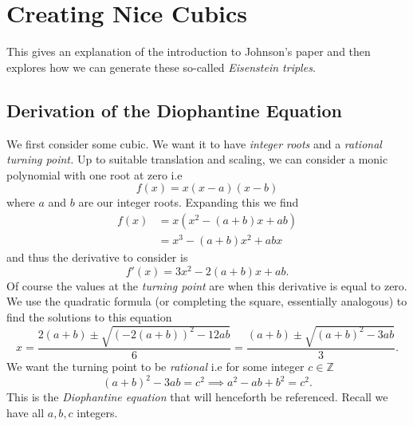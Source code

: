 \documentclass[12pt]{article}
\newcommand{\Z}{\mathbb{Z}}
\begin{document}
\section{Creating Nice Cubics}
This gives an explanation of the introduction to Johnson's paper and then explores how we can generate these so-called \textit{Eisenstein triples}.

\subsection{Derivation of the Diophantine Equation}
We first consider some cubic. We want it to have \textit{integer roots} and a \textit{rational turning point.} Up to suitable translation and scaling, we can consider a monic polynomial with one root at zero i.e
\begin{equation*}
    f(x) = x(x-a)(x-b)
\end{equation*}
where $a$ and $b$ are our integer roots. Expanding this we find
\begin{align*}
    f(x) &= x(x^2 - (a + b)x + ab)\\
    &= x^3 - (a+b)x^2 + abx
\end{align*}
and thus the derivative to consider is
\begin{equation*}
    f'(x) = 3x^2 - 2(a+b)x + ab.
\end{equation*}
Of course the values at the \textit{turning point} are when this derivative is equal to zero. We use the quadratic formula (or completing the square, essentially analogous) to find the solutions to this equation
\begin{equation*}
    x = \frac{2(a+b) \pm \sqrt{(-2(a+b))^2-12ab}}{6} = \frac{(a+b) \pm \sqrt{(a+b)^2 - 3ab}}{3}.
\end{equation*}
We want the turning point to be \textit{rational} i.e for some integer $c \in \Z$
\begin{equation}\label{eq:diophantine_eq1}
    (a+b)^2 - 3ab = c^2 \implies a^2 - ab + b^2 = c^2.
\end{equation}
This is the \textit{Diophantine equation} that will henceforth be referenced. Recall we have all $a, b, c$ integers.
\end{document}

